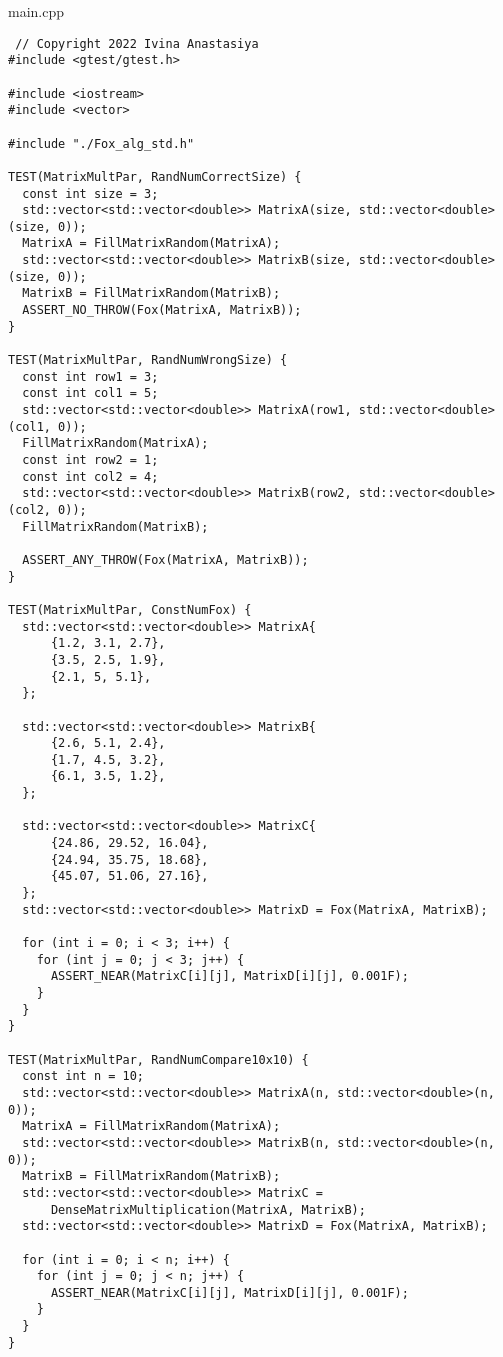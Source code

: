 \documentclass{report}
\begin{document}
 main.cpp
 \begin{lstlisting}
 // Copyright 2022 Ivina Anastasiya
#include <gtest/gtest.h>

#include <iostream>
#include <vector>

#include "./Fox_alg_std.h"

TEST(MatrixMultPar, RandNumCorrectSize) {
  const int size = 3;
  std::vector<std::vector<double>> MatrixA(size, std::vector<double>(size, 0));
  MatrixA = FillMatrixRandom(MatrixA);
  std::vector<std::vector<double>> MatrixB(size, std::vector<double>(size, 0));
  MatrixB = FillMatrixRandom(MatrixB);
  ASSERT_NO_THROW(Fox(MatrixA, MatrixB));
}

TEST(MatrixMultPar, RandNumWrongSize) {
  const int row1 = 3;
  const int col1 = 5;
  std::vector<std::vector<double>> MatrixA(row1, std::vector<double>(col1, 0));
  FillMatrixRandom(MatrixA);
  const int row2 = 1;
  const int col2 = 4;
  std::vector<std::vector<double>> MatrixB(row2, std::vector<double>(col2, 0));
  FillMatrixRandom(MatrixB);

  ASSERT_ANY_THROW(Fox(MatrixA, MatrixB));
}

TEST(MatrixMultPar, ConstNumFox) {
  std::vector<std::vector<double>> MatrixA{
      {1.2, 3.1, 2.7},
      {3.5, 2.5, 1.9},
      {2.1, 5, 5.1},
  };

  std::vector<std::vector<double>> MatrixB{
      {2.6, 5.1, 2.4},
      {1.7, 4.5, 3.2},
      {6.1, 3.5, 1.2},
  };

  std::vector<std::vector<double>> MatrixC{
      {24.86, 29.52, 16.04},
      {24.94, 35.75, 18.68},
      {45.07, 51.06, 27.16},
  };
  std::vector<std::vector<double>> MatrixD = Fox(MatrixA, MatrixB);

  for (int i = 0; i < 3; i++) {
    for (int j = 0; j < 3; j++) {
      ASSERT_NEAR(MatrixC[i][j], MatrixD[i][j], 0.001F);
    }
  }
}

TEST(MatrixMultPar, RandNumCompare10x10) {
  const int n = 10;
  std::vector<std::vector<double>> MatrixA(n, std::vector<double>(n, 0));
  MatrixA = FillMatrixRandom(MatrixA);
  std::vector<std::vector<double>> MatrixB(n, std::vector<double>(n, 0));
  MatrixB = FillMatrixRandom(MatrixB);
  std::vector<std::vector<double>> MatrixC =
      DenseMatrixMultiplication(MatrixA, MatrixB);
  std::vector<std::vector<double>> MatrixD = Fox(MatrixA, MatrixB);

  for (int i = 0; i < n; i++) {
    for (int j = 0; j < n; j++) {
      ASSERT_NEAR(MatrixC[i][j], MatrixD[i][j], 0.001F);
    }
  }
}


\end{lstlisting}
\end{document}
